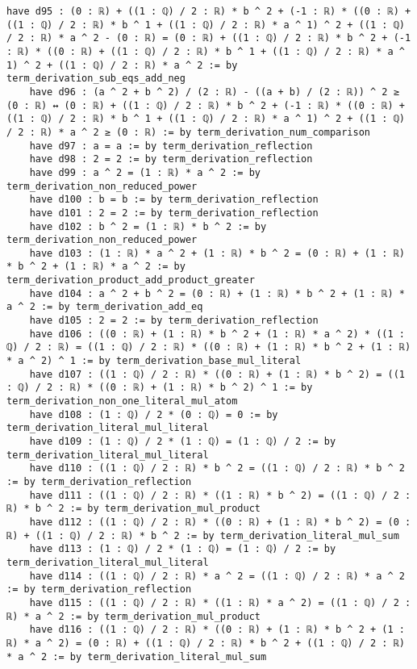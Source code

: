\documentclass{article}
\begin{document}
\begin{tcolorbox}[colback=white!10, width=\linewidth]
\begin{lstlisting}[language=Lean4]
    have d95 : (0 : ℝ) + ((1 : ℚ) / 2 : ℝ) * b ^ 2 + (-1 : ℝ) * ((0 : ℝ) + ((1 : ℚ) / 2 : ℝ) * b ^ 1 + ((1 : ℚ) / 2 : ℝ) * a ^ 1) ^ 2 + ((1 : ℚ) / 2 : ℝ) * a ^ 2 - (0 : ℝ) = (0 : ℝ) + ((1 : ℚ) / 2 : ℝ) * b ^ 2 + (-1 : ℝ) * ((0 : ℝ) + ((1 : ℚ) / 2 : ℝ) * b ^ 1 + ((1 : ℚ) / 2 : ℝ) * a ^ 1) ^ 2 + ((1 : ℚ) / 2 : ℝ) * a ^ 2 := by term_derivation_sub_eqs_add_neg
    have d96 : (a ^ 2 + b ^ 2) / (2 : ℝ) - ((a + b) / (2 : ℝ)) ^ 2 ≥ (0 : ℝ) ↔ (0 : ℝ) + ((1 : ℚ) / 2 : ℝ) * b ^ 2 + (-1 : ℝ) * ((0 : ℝ) + ((1 : ℚ) / 2 : ℝ) * b ^ 1 + ((1 : ℚ) / 2 : ℝ) * a ^ 1) ^ 2 + ((1 : ℚ) / 2 : ℝ) * a ^ 2 ≥ (0 : ℝ) := by term_derivation_num_comparison
    have d97 : a = a := by term_derivation_reflection
    have d98 : 2 = 2 := by term_derivation_reflection
    have d99 : a ^ 2 = (1 : ℝ) * a ^ 2 := by term_derivation_non_reduced_power
    have d100 : b = b := by term_derivation_reflection
    have d101 : 2 = 2 := by term_derivation_reflection
    have d102 : b ^ 2 = (1 : ℝ) * b ^ 2 := by term_derivation_non_reduced_power
    have d103 : (1 : ℝ) * a ^ 2 + (1 : ℝ) * b ^ 2 = (0 : ℝ) + (1 : ℝ) * b ^ 2 + (1 : ℝ) * a ^ 2 := by term_derivation_product_add_product_greater
    have d104 : a ^ 2 + b ^ 2 = (0 : ℝ) + (1 : ℝ) * b ^ 2 + (1 : ℝ) * a ^ 2 := by term_derivation_add_eq
    have d105 : 2 = 2 := by term_derivation_reflection
    have d106 : ((0 : ℝ) + (1 : ℝ) * b ^ 2 + (1 : ℝ) * a ^ 2) * ((1 : ℚ) / 2 : ℝ) = ((1 : ℚ) / 2 : ℝ) * ((0 : ℝ) + (1 : ℝ) * b ^ 2 + (1 : ℝ) * a ^ 2) ^ 1 := by term_derivation_base_mul_literal
    have d107 : ((1 : ℚ) / 2 : ℝ) * ((0 : ℝ) + (1 : ℝ) * b ^ 2) = ((1 : ℚ) / 2 : ℝ) * ((0 : ℝ) + (1 : ℝ) * b ^ 2) ^ 1 := by term_derivation_non_one_literal_mul_atom
    have d108 : (1 : ℚ) / 2 * (0 : ℚ) = 0 := by term_derivation_literal_mul_literal
    have d109 : (1 : ℚ) / 2 * (1 : ℚ) = (1 : ℚ) / 2 := by term_derivation_literal_mul_literal
    have d110 : ((1 : ℚ) / 2 : ℝ) * b ^ 2 = ((1 : ℚ) / 2 : ℝ) * b ^ 2 := by term_derivation_reflection
    have d111 : ((1 : ℚ) / 2 : ℝ) * ((1 : ℝ) * b ^ 2) = ((1 : ℚ) / 2 : ℝ) * b ^ 2 := by term_derivation_mul_product
    have d112 : ((1 : ℚ) / 2 : ℝ) * ((0 : ℝ) + (1 : ℝ) * b ^ 2) = (0 : ℝ) + ((1 : ℚ) / 2 : ℝ) * b ^ 2 := by term_derivation_literal_mul_sum
    have d113 : (1 : ℚ) / 2 * (1 : ℚ) = (1 : ℚ) / 2 := by term_derivation_literal_mul_literal
    have d114 : ((1 : ℚ) / 2 : ℝ) * a ^ 2 = ((1 : ℚ) / 2 : ℝ) * a ^ 2 := by term_derivation_reflection
    have d115 : ((1 : ℚ) / 2 : ℝ) * ((1 : ℝ) * a ^ 2) = ((1 : ℚ) / 2 : ℝ) * a ^ 2 := by term_derivation_mul_product
    have d116 : ((1 : ℚ) / 2 : ℝ) * ((0 : ℝ) + (1 : ℝ) * b ^ 2 + (1 : ℝ) * a ^ 2) = (0 : ℝ) + ((1 : ℚ) / 2 : ℝ) * b ^ 2 + ((1 : ℚ) / 2 : ℝ) * a ^ 2 := by term_derivation_literal_mul_sum

\end{lstlisting}
\end{tcolorbox}
\end{document}
